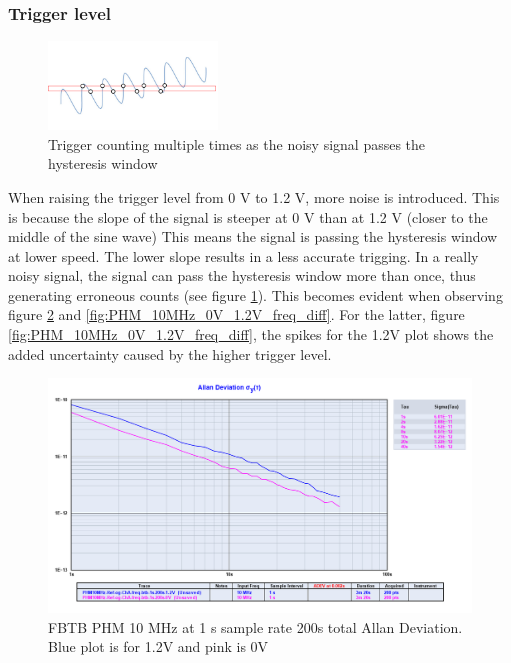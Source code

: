 \documentclass[11pt,english,a4paper]{article}
\begin{document}
\newpage
\subsubsection{Trigger level}
\begin{figure}
  \centering
  \includegraphics[width=0.40\textwidth]{hysteresis.pdf}
  \caption{Trigger counting multiple times as the noisy signal passes the hysteresis window}
    \label{fig:hysteresis}
\end{figure}
When raising the trigger level from 0 V to 1.2 V, more noise is introduced. This is because the slope of the signal is steeper at 0 V than at 1.2 V (closer to the middle of the sine wave) This means the signal is passing the hysteresis window at lower speed. The lower slope results in a less accurate trigging. In a really noisy signal, the signal can pass the hysteresis window more than once, thus generating erroneous counts (see figure \ref{fig:hysteresis}). This becomes evident when observing figure \ref{fig:PHM_10MHz_0V_1.2V_allan_dev} and \ref{fig:PHM_10MHz_0V_1.2V_freq_diff}. For the latter, figure \ref{fig:PHM_10MHz_0V_1.2V_freq_diff}, the spikes for the 1.2V plot shows the added uncertainty caused by the higher trigger level.

\begin{figure}[!htb]
  \centering
    \includegraphics[width=1\textwidth]{PHM10MHz-Ref-og-ChA-freq-btb-1s-200s-allan.png}
    \caption{FBTB PHM 10 MHz at 1 s sample rate 200s total Allan Deviation. Blue plot is for 1.2V and pink is 0V}
        \label{fig:PHM_10MHz_0V_1.2V_allan_dev}
\end{figure}
\end{document}
